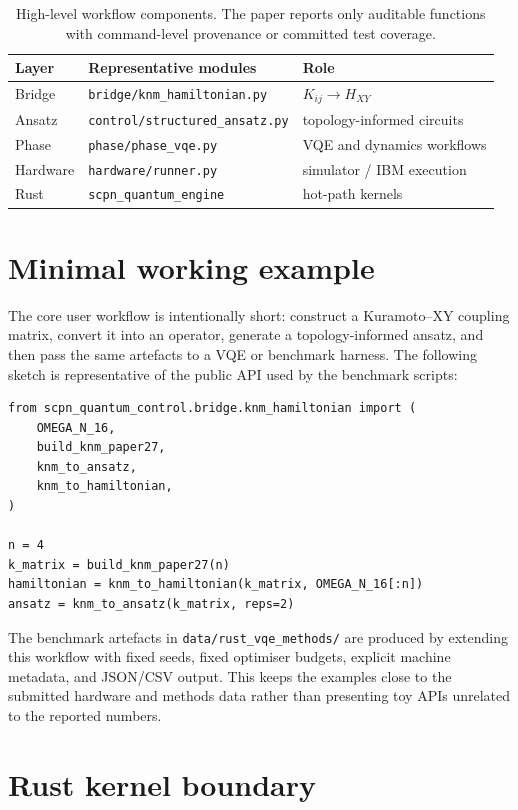 \documentclass[preprint,aps,physrev,superscriptaddress,floatfix,longbibliography]{revtex4-2}
\begin{document}
\begin{table}[tb]
\centering
\small
\begin{tabular}{lll}
\toprule
Layer & Representative modules & Role \\
\midrule
Bridge & \texttt{bridge/knm\_hamiltonian.py} & $K_{ij}\rightarrow H_{XY}$ \\
Ansatz & \texttt{control/structured\_ansatz.py} & topology-informed circuits \\
Phase & \texttt{phase/phase\_vqe.py} & VQE and dynamics workflows \\
Hardware & \texttt{hardware/runner.py} & simulator / IBM execution \\
Rust & \texttt{scpn\_quantum\_engine} & hot-path kernels \\
\bottomrule
\end{tabular}
\caption{High-level workflow components. The paper reports only
auditable functions with command-level provenance or committed test
coverage.}
\label{tab:architecture}
\end{table}

\section{Minimal working example}

The core user workflow is intentionally short: construct a Kuramoto--XY
coupling matrix, convert it into an operator, generate a topology-informed
ansatz, and then pass the same artefacts to a VQE or benchmark harness.
The following sketch is representative of the public API used by the
benchmark scripts:

\begin{verbatim}
from scpn_quantum_control.bridge.knm_hamiltonian import (
    OMEGA_N_16,
    build_knm_paper27,
    knm_to_ansatz,
    knm_to_hamiltonian,
)

n = 4
k_matrix = build_knm_paper27(n)
hamiltonian = knm_to_hamiltonian(k_matrix, OMEGA_N_16[:n])
ansatz = knm_to_ansatz(k_matrix, reps=2)
\end{verbatim}

The benchmark artefacts in \texttt{data/rust\_vqe\_methods/} are produced
by extending this workflow with fixed seeds, fixed optimiser budgets,
explicit machine metadata, and JSON/CSV output. This keeps the examples
close to the submitted hardware and methods data rather than presenting
toy APIs unrelated to the reported numbers.

\section{Rust kernel boundary}
\end{document}
